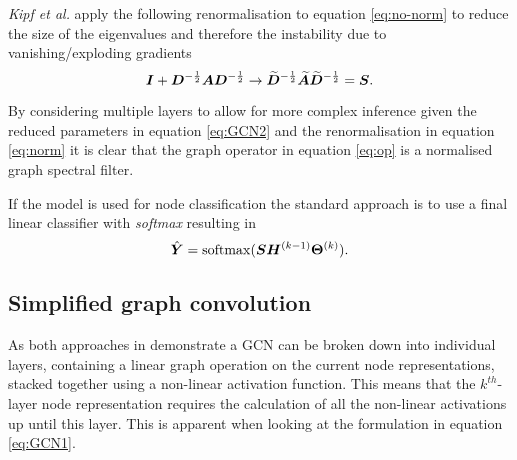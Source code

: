 \textit{Kipf et al.}\cite{kipf2016semi} apply the following renormalisation to equation \ref{eq:no-norm} to reduce the size of the eigenvalues and therefore the instability due to vanishing/exploding gradients
\begin{equation}
    \label{eq:norm}
    {\bm{I}} + {\bm{D}}^{-\frac12}{\bm{A}}{\bm{D}}^{-\frac12} \to \widetilde{{\bm{D}}}^{-\frac12}\widetilde{{\bm{A}}}\widetilde{{\bm{D}}}^{-\frac12} = {\bm{S}}.
\end{equation}

By considering multiple layers to allow for more complex inference given the reduced parameters in equation \ref{eq:GCN2} and the renormalisation in equation \ref{eq:norm} it is clear that the graph operator in equation \ref{eq:op} is a normalised graph spectral filter.






If the model is used for node classification the standard approach is to use a final linear classifier with \emph{softmax} resulting in 
\begin{equation}
    \label{eq:cls}
    \hat{{\bm{Y}}} = \operatorname{softmax}({\bm{S}}{\bm{H}}^{(k-1)}\bm{\Theta}^{(k)}).
\end{equation}

\subsection{Simplified graph convolution}



As both approaches in  demonstrate a GCN can be broken down into individual layers, containing a linear graph operation on the current node representations, stacked together using a non-linear activation function.
This means that the $k^{th}$-layer node representation requires the calculation of all the non-linear activations up until this layer.
This is apparent when looking at the formulation in equation \ref{eq:GCN1}.

